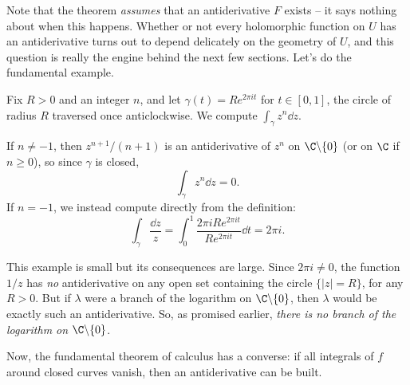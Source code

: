 Note that the theorem \emph{assumes} that an antiderivative $F$ exists -- it says nothing about when this happens. Whether or not every holomorphic function on $U$ has an antiderivative turns out to depend delicately on the geometry of $U$, and this question is really the engine behind the next few sections. Let's do the fundamental example.

\begin{example}
    Fix $R > 0$ and an integer $n$, and let $\gamma(t) = Re^{2\pi i t}$ for $t \in [0, 1]$, the circle of radius $R$ traversed once anticlockwise. We compute $\int_\gamma z^n \dd z$.

    If $n \neq -1$, then $z^{n + 1}/(n + 1)$ is an antiderivative of $z^n$ on $\C \backslash \{0\}$ (or on $\C$ if $n \geq 0$), so since $\gamma$ is closed,
    $$
    \int_\gamma z^n \dd z = 0.
    $$
    If $n = -1$, we instead compute directly from the definition:
    $$
    \int_\gamma \frac{\dd z}{z} = \int_0^1 \frac{2 \pi i R e^{2\pi i t}}{Re^{2 \pi i t}} \dd t = 2 \pi i.
    $$
\end{example}

This example is small but its consequences are large. Since $2\pi i \neq 0$, the function $1/z$ has \emph{no} antiderivative on any open set containing the circle $\{|z| = R\}$, for any $R > 0$. But if $\lambda$ were a branch of the logarithm on $\C \backslash \{0\}$, then $\lambda$ would be exactly such an antiderivative. So, as promised earlier, \emph{there is no branch of the logarithm on $\C \backslash \{0\}$}.

Now, the fundamental theorem of calculus has a converse: if all integrals of $f$ around closed curves vanish, then an antiderivative can be built.

